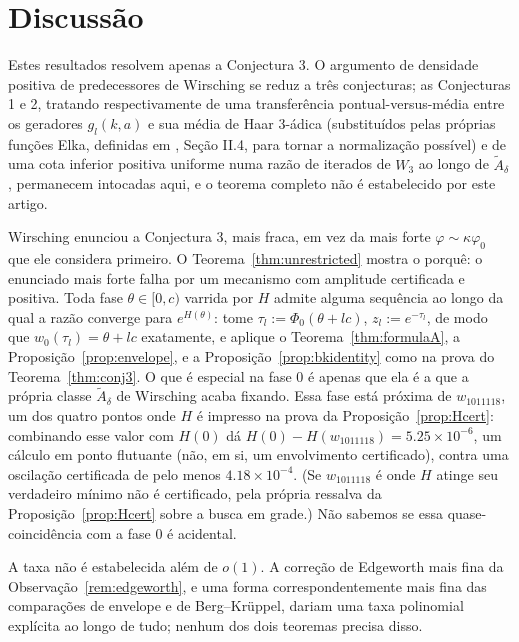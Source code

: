 \documentclass[11pt]{amsart}
\theoremstyle{plain}
\theoremstyle{definition}
\theoremstyle{remark}
\begin{document}
\section{Discussão}
\label{sec:discussion}

Estes resultados resolvem apenas a Conjectura 3. O argumento de densidade positiva de predecessores
de Wirsching se reduz a três conjecturas; as Conjecturas 1 e 2, tratando respectivamente de uma
transferência pontual-versus-média entre os geradores $g_l(k,a)$ e sua média de Haar $3$-ádica
(substituídos pelas próprias funções Elka, definidas em \cite{wirsching1998}, Seção II.4, para
tornar a normalização possível) e de uma cota inferior positiva uniforme numa razão de iterados de
$W_3$ ao longo de $\widetilde A_\delta$, permanecem intocadas aqui, e o teorema completo não é
estabelecido por este artigo.

Wirsching enunciou a Conjectura 3, mais fraca, em vez da mais forte $\varphi\sim\kappa\varphi_0$
que ele considera primeiro. O Teorema~\ref{thm:unrestricted} mostra o porquê: o enunciado mais
forte falha por um mecanismo com amplitude certificada e positiva. Toda fase $\theta\in[0,c)$
varrida por $H$ admite alguma sequência ao longo da qual a razão converge para $e^{H(\theta)}$:
tome $\tau_l := \Phi_0(\theta+lc)$, $z_l := e^{-\tau_l}$, de modo que $w_0(\tau_l)=\theta+lc$
exatamente, e aplique o Teorema~\ref{thm:formulaA}, a Proposição~\ref{prop:envelope}, e a
Proposição~\ref{prop:bkidentity} como na prova do Teorema~\ref{thm:conj3}. O que é especial na
fase $0$ é apenas que ela é a que a própria classe $\widetilde A_\delta$ de Wirsching acaba
fixando. Essa fase está próxima de $w_{1011118}$, um dos quatro pontos onde $H$ é impresso na prova
da Proposição~\ref{prop:Hcert}: combinando esse valor com $H(0)$ dá
$H(0) - H(w_{1011118}) = 5.25\times10^{-6}$, um cálculo em ponto flutuante (não, em si, um
envolvimento certificado), contra uma oscilação certificada de pelo menos $4.18\times10^{-4}$.
(Se $w_{1011118}$ é onde $H$ atinge seu verdadeiro mínimo não é certificado, pela própria ressalva
da Proposição~\ref{prop:Hcert} sobre a busca em grade.) Não sabemos se essa quase-coincidência com
a fase $0$ é acidental.

A taxa não é estabelecida além de $o(1)$. A correção de Edgeworth mais fina da
Observação~\ref{rem:edgeworth}, e uma forma correspondentemente mais fina das comparações de
envelope e de Berg--Kr\"uppel, dariam uma taxa polinomial explícita ao longo de tudo; nenhum dos
dois teoremas precisa disso.
\end{document}
